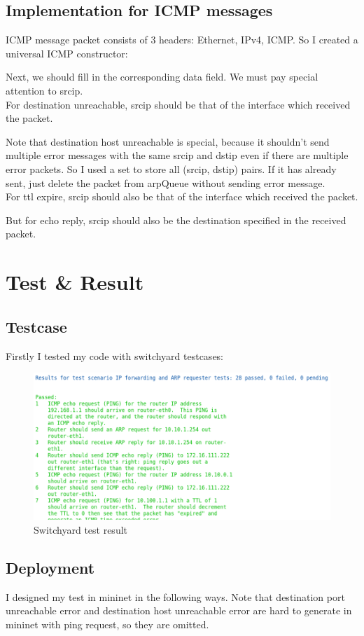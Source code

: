 \documentclass[12pt,a4paper,UTF8]{article}
\begin{document}
\subsection{Implementation for ICMP messages}
ICMP message packet consists of 3 headers: Ethernet, IPv4, ICMP. So I created a universal ICMP constructor:

Next, we should fill in the corresponding data field. We must pay special attention to srcip. \\
For destination unreachable, srcip should be that of the interface which received the packet.

Note that destination host unreachable is special, because it shouldn't send multiple error messages with the same srcip and dstip even if there are multiple error packets. So I used a set to store all (srcip, dstip) pairs. If it has already sent, just delete the packet from arpQueue without sending error message. \\
For ttl expire, srcip should also be that of the interface which received the packet.

But for echo reply, srcip should also be the destination specified in the received packet.


\section{Test \& Result}
\subsection{Testcase}
Firstly I tested my code with switchyard testcases:
\begin{figure}[htbp]
	\centering
	\includegraphics[width=\textwidth]{1}
	\caption{Switchyard test result}
\end{figure}
\newpage

\subsection{Deployment}
I designed my test in mininet in the following ways. Note that destination port unreachable error and destination host unreachable error are hard to generate in mininet with ping request, so they are omitted.
\end{document}
